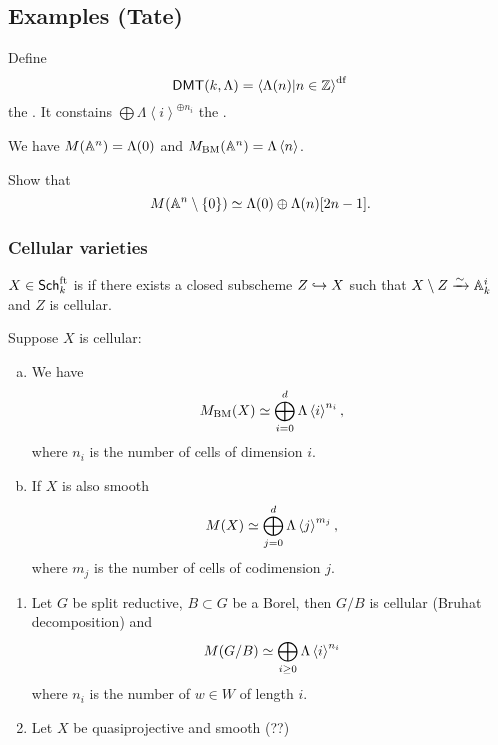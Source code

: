 \subsection{Examples (Tate)}
\begin{definition}
Define
\[
\mathsf{DMT}(k,\Lambda) = \left<\Lambda(n) | n\in \mathbb Z \right>^{\text{df}}
\]
the . It constains $\bigoplus \Lambda\left<i \right>^{\oplus
n_i}$ the .
\end{definition}
We have $M(\mathbb A^{n})=\Lambda(0)$ and $M_{\text{BM}}(\mathbb A^{n}) = \Lambda\left<n \right>$.
\begin{exercise}
Show that
\[
M(\mathbb A^{n}\setminus \{0\}) \simeq \Lambda(0) \oplus \Lambda(n)[2n-1].
\]
\end{exercise}
\subsubsection{Cellular varieties}
\begin{definition}
$X\in \mathsf{Sch}_k^{\text{ft}}$ is  if there exists a closed subscheme $Z\hookrightarrow
X$ such that $X\setminus Z\xrightarrow{\sim} \mathbb A_k^{i}$ and $Z$ is cellular.
\end{definition}
\begin{proposition}
Suppose $X$ is cellular:
\begin{enumerate}[a)]
\item We have
\[
M_{\text{BM}}(X) \simeq \bigoplus_{i=0}^{d}\Lambda\left<i \right>^{n_i},
\]
where $n_i$ is the number of cells of dimension $i$.
\item If $X$ is also smooth
\[
M(X) \simeq \bigoplus_{j=0}^{d}\Lambda\left<j \right>^{m_j},
\]
where $m_j$ is the number of cells of codimension $j$.
\end{enumerate}
\end{proposition}
\begin{example}\leavevmode
\begin{enumerate}[1)]
\item Let $G$ be split reductive, $B\subset G$ be a Borel, then $G /B$ is cellular
(Bruhat decomposition) and
\[
M(G /B) \simeq \bigoplus_{i\ge 0}\Lambda\left<i \right>^{n_i}
\]
where $n_i$ is the number of $w\in W$ of length $i$.
\item Let $X$ be quasiprojective and smooth (??)
\end{enumerate}
\end{example}
